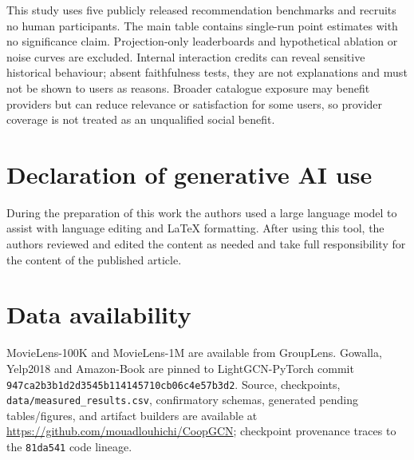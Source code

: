 \documentclass[a4paper,fleqn,longmktitle]{cas-dc}
\begin{document}
This study uses five publicly released recommendation benchmarks and recruits
no human participants. The main table contains single-run point estimates with
no significance claim. Projection-only leaderboards and hypothetical ablation or
noise curves are excluded. Internal interaction credits can reveal sensitive
historical behaviour; absent faithfulness tests, they are not explanations and
must not be shown to users as reasons. Broader catalogue exposure may benefit
providers but can reduce relevance or satisfaction for some users, so provider
coverage is not treated as an unqualified social benefit.

\section*{Declaration of generative AI use}

During the preparation of this work the authors used a large language model to
assist with language editing and LaTeX formatting. After using this tool, the
authors reviewed and edited the content as needed and take full responsibility
for the content of the published article.

\section*{Data availability}

MovieLens-100K and MovieLens-1M are available from GroupLens. Gowalla,
Yelp2018 and Amazon-Book are pinned to LightGCN-PyTorch commit
\texttt{947ca2b3b1d2d3545b114145710cb06c4e57b3d2}. Source, checkpoints,
\texttt{data/measured\_results.csv}, confirmatory schemas, generated pending
tables/figures, and artifact builders are available at
\url{https://github.com/mouadlouhichi/CoopGCN}; checkpoint
provenance traces to the \texttt{81da541} code lineage.



\end{document}

